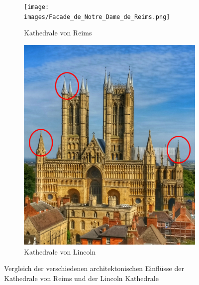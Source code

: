 \documentclass[a4paper, ngerman, 12pt, usenames, dvipsnames]{article}
\begin{document}
\begin{figure}[h]
    \centering
    \begin{subfigure}{.43\textwidth}
        \centering
        \texttt{[image: images/Facade\_de\_Notre\_Dame\_de\_Reims.png]}
        \caption{Kathedrale von Reims \footnotemark[2]}
    \end{subfigure}%
    \begin{subfigure}{.57\textwidth}
        \centering
        \includegraphics[width=.9\linewidth]{images/LincolnCathedral.jpg}
        \caption{Kathedrale von Lincoln \footnotemark[3]}
    \end{subfigure}
    \caption{Vergleich der verschiedenen architektonischen Einflüsse der Kathedrale von Reims und der Lincoln Kathedrale}
\end{figure}
\end{document}
